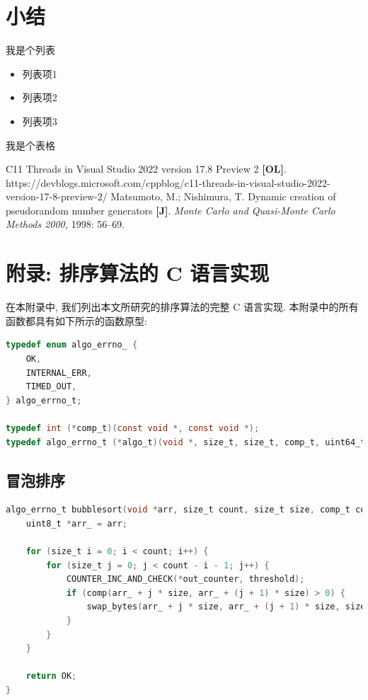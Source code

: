 \documentclass[12pt]{article}
\begin{document}
\section{小结}

我是个列表

\begin{itemize}
\item 列表项1
\item 列表项2
\item 列表项3
\end{itemize}

我是个表格


\begin{thebibliography}{}

 C11 Threads in Visual Studio 2022 version 17.8 Preview 2 \textbf{[OL]}. https://devblogs.microsoft.com/cppblog/c11-threads-in-visual-studio-2022-version-17-8-preview-2/
 Matsumoto, M.; Nishimura, T. Dynamic creation of pseudorandom number generators \textbf{[J]}. \textit{Monte Carlo and Quasi-Monte Carlo Methods 2000,} 1998: 56–69.

\end{thebibliography}

\appendix

\section{附录: 排序算法的 C 语言实现}

在本附录中, 我们列出本文所研究的排序算法的完整 C 语言实现. 本附录中的所有函数都具有如下所示的函数原型:
\begin{lstlisting}[language=C]
typedef enum algo_errno_ {
    OK,
    INTERNAL_ERR,
    TIMED_OUT,
} algo_errno_t;

typedef int (*comp_t)(const void *, const void *);
typedef algo_errno_t (*algo_t)(void *, size_t, size_t, comp_t, uint64_t, uint64_t *);
\end{lstlisting}

\subsection{冒泡排序}

\begin{lstlisting}[language=C]
algo_errno_t bubblesort(void *arr, size_t count, size_t size, comp_t comp, uint64_t threshold, uint64_t *out_counter) {
    uint8_t *arr_ = arr;

    for (size_t i = 0; i < count; i++) {
        for (size_t j = 0; j < count - i - 1; j++) {
            COUNTER_INC_AND_CHECK(*out_counter, threshold);
            if (comp(arr_ + j * size, arr_ + (j + 1) * size) > 0) {
                swap_bytes(arr_ + j * size, arr_ + (j + 1) * size, size);
            }
        }
    }

    return OK;
}
\end{lstlisting}
\end{document}
